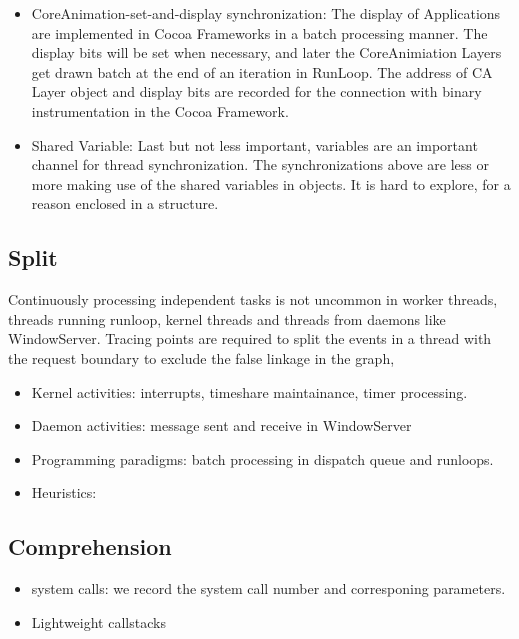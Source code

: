 \begin{itemize}
        \item CoreAnimation-set-and-display synchronization: The display of Applications are implemented in Cocoa Frameworks in a batch processing manner. The display bits will be set when necessary, and later the CoreAnimiation Layers get drawn batch at the end of an iteration in RunLoop. The address of CA Layer object and display bits are recorded for the connection with binary instrumentation in the Cocoa Framework.
        \item Shared Variable: Last but not less important, variables are an important channel for thread synchronization. The synchronizations above are less or more making use of the shared variables in objects. It is hard to explore, for a reason enclosed in a structure.
\end{itemize}

\subsection{Split}
Continuously processing independent tasks is not uncommon in worker threads, threads running runloop, kernel threads and threads from daemons like WindowServer.
Tracing points are required to split the events in a thread with the request boundary to exclude the false linkage in the graph,
\begin{itemize}
        \item Kernel activities: interrupts, timeshare maintainance, timer processing.
        \item Daemon activities: message sent and receive in WindowServer
        \item Programming paradigms: batch processing in dispatch queue and runloops.
        \item Heuristics:
\end{itemize}

\subsection {Comprehension}
\begin{itemize}
	\item system calls: we record the system call number and corresponing parameters.
	\item Lightweight callstacks
\end{itemize}
